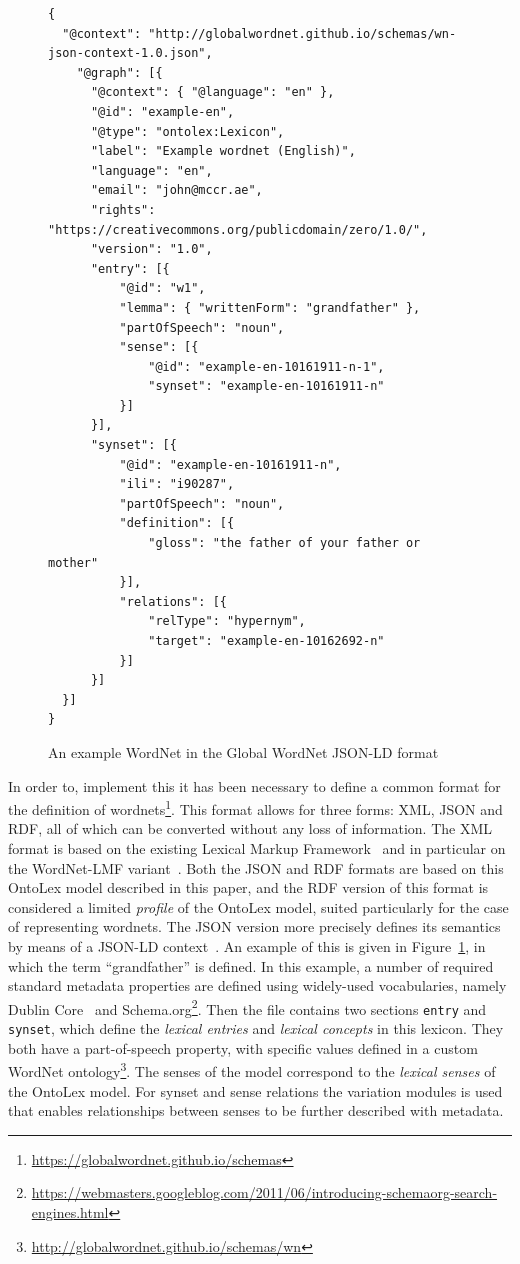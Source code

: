 \documentclass[12pt,a4paper]{elex2017}
\begin{document}
\begin{figure}
    \footnotesize
    \begin{verbatim}
{ 
  "@context": "http://globalwordnet.github.io/schemas/wn-json-context-1.0.json",
    "@graph": [{
      "@context": { "@language": "en" },
      "@id": "example-en",
      "@type": "ontolex:Lexicon", 
      "label": "Example wordnet (English)",
      "language": "en",
      "email": "john@mccr.ae",
      "rights": "https://creativecommons.org/publicdomain/zero/1.0/",
      "version": "1.0",
      "entry": [{
          "@id": "w1",
          "lemma": { "writtenForm": "grandfather" },
          "partOfSpeech": "noun",
          "sense": [{
              "@id": "example-en-10161911-n-1",
              "synset": "example-en-10161911-n"
          }]
      }],
      "synset": [{
          "@id": "example-en-10161911-n",
          "ili": "i90287",
          "partOfSpeech": "noun",
          "definition": [{
              "gloss": "the father of your father or mother"
          }],
          "relations": [{
              "relType": "hypernym",
              "target": "example-en-10162692-n"
          }]
      }]
  }]
}
    \end{verbatim}
    \caption{\label{fig:json-example}An example WordNet in the Global WordNet
    JSON-LD format}
\end{figure}



In order to, implement this it has been necessary to define a common format for
the definition of
wordnets\footnote{\url{https://globalwordnet.github.io/schemas}}. This format
allows for three forms: XML, JSON and RDF, all of which can be converted without
any loss of information. The XML format is based on the existing Lexical Markup
Framework~\citep{francopoulo2006lexical} and in particular on the WordNet-LMF
variant~\citep{soria2009wordnet}. Both the JSON and RDF formats are based on this
OntoLex model described in this paper, and the RDF version of this format is
considered a limited \emph{profile} of the OntoLex model, suited particularly
for the case of representing wordnets. The JSON version more precisely defines
its semantics by means of a JSON-LD context~\citep{sporny2014json}. An example
of this is given in Figure~\ref{fig:json-example}, in which the term
``grandfather'' is defined. In this example, a number of required standard
metadata properties are defined using widely-used vocabularies, namely Dublin
Core~\citep{rfc2413} and
Schema.org\footnote{\url{https://webmasters.googleblog.com/2011/06/introducing-schemaorg-search-engines.html}}.
Then the file contains two sections \texttt{entry} and \texttt{synset}, which
define the \emph{lexical entries} and \emph{lexical concepts} in this lexicon.
They both have a part-of-speech property, with specific values defined in a
custom WordNet
ontology\footnote{\url{http://globalwordnet.github.io/schemas/wn}}. The senses
of the model correspond to the \emph{lexical senses} of the OntoLex
model. For synset and sense relations the variation modules is used that enables
relationships between senses to be further described with metadata.
\end{document}
